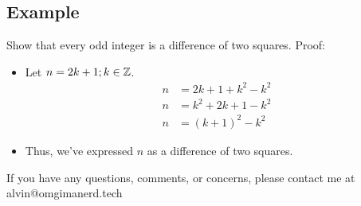 \documentclass[letterpaper, 12pt]{math}
\begin{document}
\subsection*{Example}
Show that every odd integer is a difference of two squares. Proof:
\begin{itemize}
  \item Let \( n = 2k+1; k\in\mathbb{Z} \).
    \begin{align*}
      n &= 2k+1+k^{2}-k^{2} \\
      n &= k^{2}+2k+1-k^{2} \\
      n &= (k+1)^{2}-k^{2}
    \end{align*}
  \item Thus, we've expressed \( n \) as a difference of two squares.
\end{itemize}

\begin{center}
  If you have any questions, comments, or concerns, please contact me at
  alvin@omgimanerd.tech
\end{center}
\end{document}
